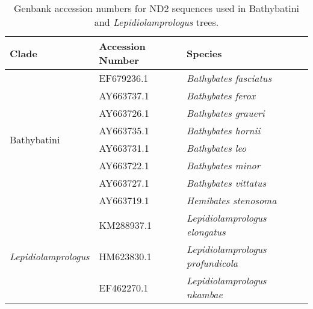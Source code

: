 \begin{table}[]
\centering
\begin{tabular}{@{}lll@{}}
\toprule
\textbf{Clade} & \textbf{Accession Number} & \textbf{Species} \\ \midrule
\multirow{8}{*}{Bathybatini} & EF679236.1 & \textit{Bathybates fasciatus} \\
 & AY663737.1 & \textit{Bathybates ferox} \\
 & AY663726.1 & \textit{Bathybates graueri} \\
 & AY663735.1 & \textit{Bathybates hornii} \\
 & AY663731.1 & \textit{Bathybates leo} \\
 & AY663722.1 & \textit{Bathybates minor} \\
 & AY663727.1 & \textit{Bathybates vittatus} \\
 & AY663719.1 & \textit{Hemibates stenosoma} \\
 \midrule
\multirow{3}{*}{\textit{Lepidiolamprologus}} & KM288937.1 & \textit{Lepidiolamprologus elongatus} \\
 & HM623830.1 & \textit{Lepidiolamprologus profundicola} \\
 & EF462270.1 & \textit{Lepidiolamprologus nkambae} \\ \bottomrule
\end{tabular}
\caption{Genbank accession numbers for ND2 sequences used in Bathybatini and {\em Lepidiolamprologus} trees.}
\label{FJ_table6}
\end{table}